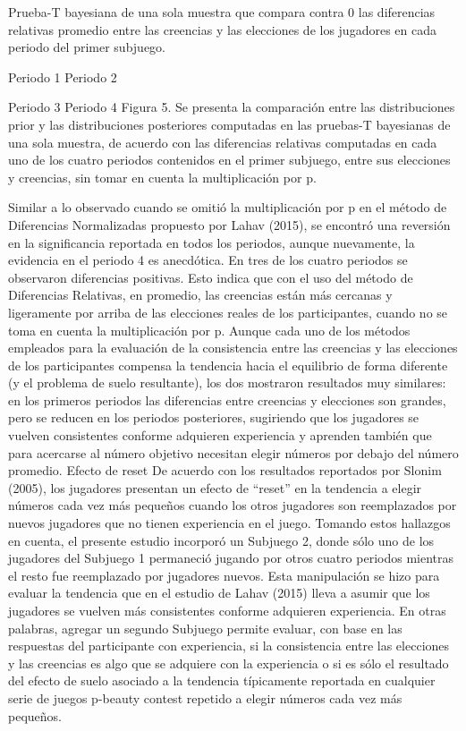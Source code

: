 Prueba-T bayesiana de una sola muestra que compara contra 0 las diferencias relativas promedio entre las creencias y las elecciones de los jugadores en cada periodo del primer subjuego.

  
Periodo 1				Periodo 2
  
Periodo 3				Periodo 4
Figura 5. Se presenta la comparación entre las distribuciones prior y las distribuciones posteriores computadas en las pruebas-T bayesianas de una sola muestra, de acuerdo con las diferencias relativas computadas en cada uno de los cuatro periodos contenidos en el primer subjuego, entre sus elecciones y creencias, sin tomar en cuenta la multiplicación por p.

Similar a lo observado cuando se omitió la multiplicación por p en el método de Diferencias Normalizadas propuesto por Lahav (2015), se encontró una reversión en la significancia reportada en todos los periodos, aunque nuevamente, la evidencia en el periodo 4 es anecdótica. En tres de los cuatro periodos se observaron diferencias positivas. Esto indica que con el uso del método de Diferencias Relativas, en promedio, las creencias están más cercanas y ligeramente por arriba de las elecciones reales de los participantes, cuando no se toma en cuenta la multiplicación por p.
Aunque cada uno de los métodos empleados para la evaluación de la consistencia entre las creencias y las elecciones de los participantes compensa la tendencia hacia el equilibrio de forma diferente (y el problema de suelo resultante), los dos mostraron resultados muy similares: en los primeros periodos las diferencias entre creencias y elecciones son grandes, pero se reducen en los periodos posteriores, sugiriendo que los jugadores se vuelven consistentes conforme adquieren experiencia y aprenden también que para acercarse al número objetivo necesitan elegir números por debajo del número promedio. 
	Efecto de reset
De acuerdo con los resultados reportados por Slonim (2005), los jugadores presentan un efecto de “reset” en la tendencia a elegir números cada vez más pequeños cuando los otros jugadores son reemplazados por nuevos jugadores que no tienen experiencia en el juego. Tomando estos hallazgos en cuenta, el presente estudio incorporó un Subjuego 2, donde sólo uno de los jugadores del Subjuego 1 permaneció jugando por otros cuatro periodos mientras el resto fue reemplazado por jugadores nuevos. Esta manipulación se hizo para evaluar la tendencia que en el estudio de Lahav (2015) lleva a asumir que los jugadores se vuelven más consistentes conforme adquieren experiencia. En otras palabras, agregar un segundo Subjuego permite evaluar, con base en las respuestas del participante con experiencia, si la consistencia entre las elecciones y las creencias es algo que se adquiere con la experiencia o si es sólo el resultado del efecto de suelo asociado a la tendencia típicamente reportada en cualquier serie de juegos p-beauty contest repetido a elegir números cada vez más pequeños.
